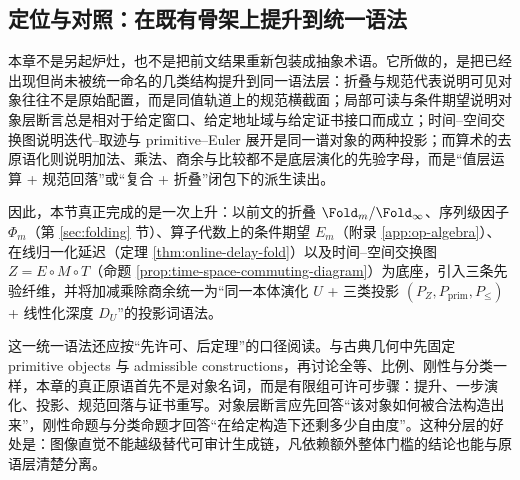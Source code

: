 \subsection{定位与对照：在既有骨架上提升到统一语法}\label{subsec:pom-position}
本章不是另起炉灶，也不是把前文结果重新包装成抽象术语。它所做的，是把已经出现但尚未被统一命名的几类结构提升到同一语法层：折叠与规范代表说明可见对象往往不是原始配置，而是同值轨道上的规范横截面；局部可读与条件期望说明对象层断言总是相对于给定窗口、给定地址域与给定证书接口而成立；时间--空间交换图说明迭代--取迹与 primitive--Euler 展开是同一谱对象的两种投影；而算术的去原语化则说明加法、乘法、商余与比较都不是底层演化的先验字母，而是“值层运算 + 规范回落”或“复合 + 折叠”闭包下的派生读出。

因此，本节真正完成的是一次上升：以前文的折叠 $\Fold_m/\Fold_\infty$、序列级因子 $\Phi_m$（第 \ref{sec:folding} 节）、算子代数上的条件期望 $E_m$（附录 \ref{app:op-algebra}）、在线归一化延迟（定理 \ref{thm:online-delay-fold}）以及时间--空间交换图 $Z=E\circ M\circ T$（命题 \ref{prop:time-space-commuting-diagram}）为底座，引入三条先验纤维，并将加减乘除商余统一为“同一本体演化 \(U\) + 三类投影 \((P_Z,P_{\mathrm{prim}},P_{\le})\) + 线性化深度 \(D_U\)”的投影词语法。

\begin{remark}\label{rem:pom-euclid-admissible-constructions}
这一统一语法还应按“先许可、后定理”的口径阅读。与古典几何中先固定 primitive objects 与 admissible constructions，再讨论全等、比例、刚性与分类一样，本章的真正原语首先不是对象名词，而是有限组可许可步骤：提升、一步演化、投影、规范回落与证书重写。对象层断言应先回答“该对象如何被合法构造出来”，刚性命题与分类命题才回答“在给定构造下还剩多少自由度”。这种分层的好处是：图像直觉不能越级替代可审计生成链，凡依赖额外整体门槛的结论也能与原语层清楚分离。
\end{remark}

